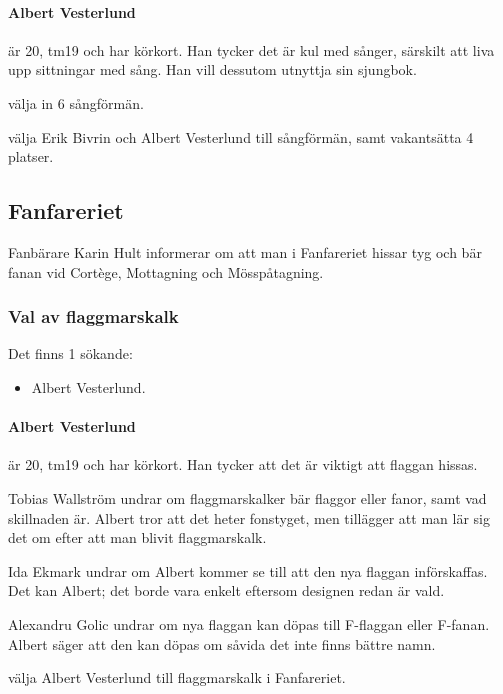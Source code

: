 \documentclass[hidelinks]{sektionsmote}
\begin{document}
\paragraph{Albert Vesterlund} är 20, tm19 och har körkort.
Han tycker det är kul med sånger, särskilt att liva upp sittningar med sång.
Han vill dessutom utnyttja sin sjungbok.

\begin{beslut}
  \item välja in 6 sångförmän.
  \item välja Erik Bivrin och Albert Vesterlund till sångförmän, samt vakantsätta 4 platser.
\end{beslut}


\subsection{Fanfareriet}
Fanbärare Karin Hult informerar om att man i Fanfareriet hissar tyg och bär fanan vid Cortège, Mottagning och Mösspåtagning.

\subsubsection{Val av flaggmarskalk}
Det finns 1 sökande:
\begin{itemize}
    \item Albert Vesterlund.
\end{itemize}

\paragraph{Albert Vesterlund} är 20, tm19 och har körkort.
Han tycker att det är viktigt att flaggan hissas.

Tobias Wallström undrar om flaggmarskalker bär flaggor eller fanor, samt vad skillnaden är.
Albert tror att det heter fonstyget, men tillägger att man lär sig det om efter att man blivit flaggmarskalk.

Ida Ekmark undrar om Albert kommer se till att den nya flaggan införskaffas.
Det kan Albert; det borde vara enkelt eftersom designen redan är vald.

Alexandru Golic undrar om nya flaggan kan döpas till F-flaggan eller F-fanan.
Albert säger att den kan döpas om såvida det inte finns bättre namn.

\begin{beslut}
  \item välja Albert Vesterlund till flaggmarskalk i Fanfareriet.
\end{beslut}
\end{document}
